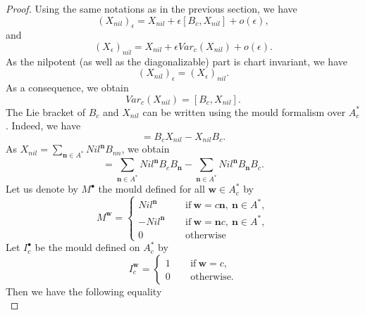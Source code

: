 \documentclass[english,11pt]{amsart}
\def\nn{\mathbf{n}}
\def\ww{\mathbf{w}}
\def\di{\displaystyle}
\def\nn{\mathbf{n}}
\begin{document}
\begin{proof}
    Using the same notations as in the previous section, we have 
    \begin{equation}
        (X_{nil} )_{\epsilon} =X_{nil} +\epsilon [B_c ,X_{nil}] +o(\epsilon ) ,
    \end{equation}
    and
    \begin{equation}
        (X_{\epsilon} )_{nil} = X_{nil} +\epsilon Var_c (X_{nil} ) +o(\epsilon ) .
    \end{equation}
As the nilpotent (as well as the diagonalizable) part is chart invariant, we have 
\begin{equation}
    (X_{nil} )_{\epsilon} = (X_{\epsilon} )_{nil} .
\end{equation}
As a consequence, we obtain
\begin{equation}
    Var_c (X_{nil} ) = [B_c ,X_{nil}] .
\end{equation}
The Lie bracket of $B_c$ and $X_{nil}$ can be written using the mould formalism over $A_c^*$. Indeed, we have 
\begin{equation}
    [B_c , X_{nil} ] =B_c X_{nil} -X_{nil} B_c .
\end{equation}
As $X_{nil} =\di\sum_{\nn \in A^*} Nil^{\nn} B_{nn}$, we obtain 
\begin{equation}
    [B_c ,X_{nil} ]= \di\sum_{\nn \in A^*} Nil^{\nn} B_c B_{\nn} - \di\sum_{\nn \in A^*} Nil^{\nn} B_{\nn} B_c .
\end{equation}
Let us denote by $M^{\bullet}$ the mould defined for all $\ww \in A_c^*$ by 
\begin{equation}
    M^{\ww} =\left \{ 
    \begin{array}{lll}
    Nil^{\nn} & \ \ & \mbox{if}\ \ww = c\nn,\ \nn \in A^* ,\\
    -Nil^{\nn} & & \mbox{if}\ \ww = \nn c,\ \nn \in A^* ,\\
    0 & & \mbox{otherwise}
    \end{array}
    \right .
\end{equation}
Let $I_c^{\bullet}$ be the mould defined on $A_c^*$ by 
\begin{equation}
    I_c^{\ww} =\left \{ 
    \begin{array}{lll}
    1 & \ \ & \mbox{if}\ \ww = c,\\
    0 & & \mbox{otherwise} .
    \end{array}
    \right .
\end{equation}
Then we have the following equality
\begin{equation}

\end{equation}
\end{proof}
\end{document}
